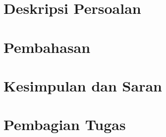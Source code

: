 \documentclass[12pt,a4paper]{report}
\begin{document}
	

	\clearpage
	\tableofcontents
	\listoffigures
	\listoftables
	\clearpage

	\chapter{Deskripsi Persoalan}
	

	\chapter{Pembahasan}
	

	\chapter{Kesimpulan dan Saran}
	

	\chapter{Pembagian Tugas}
	

	
	

	\appendix
	
\end{document}
